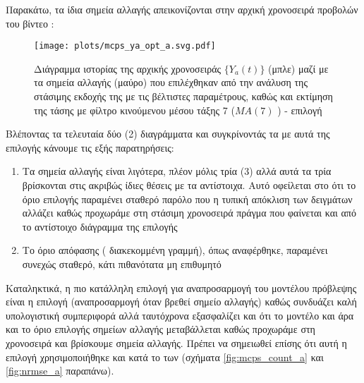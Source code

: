 Παρακάτω, τα ίδια σημεία αλλαγής απεικονίζονται στην αρχική χρονοσειρά προβολών του βίντεο :

\begin{figure}[H]
    \begin{center}
        \texttt{[image: plots/mcps\_ya\_opt\_a.svg.pdf]}
        \caption{Διάγραμμα ιστορίας της αρχικής χρονοσειράς $\{Y_a(t)\}$ (μπλε) μαζί με τα σημεία αλλαγής (μαύρο) που επιλέχθηκαν από την ανάλυση της στάσιμης εκδοχής της με τις βέλτιστες παραμέτρους, καθώς και εκτίμηση της τάσης με φίλτρο κινούμενου μέσου τάξης 7 ($MA(7)$ ) - επιλογή }
        \label{fig:mcps_ya_opt_a}
    \end{center}
\end{figure}

Βλέποντας τα τελευταία δύο (2) διαγράμματα και συγκρίνοντάς τα με αυτά της επιλογής  κάνουμε τις εξής παρατηρήσεις:
\begin{enumerate}
    \item Τα σημεία αλλαγής είναι λιγότερα, πλέον μόλις τρία (3) αλλά αυτά τα τρία βρίσκονται στις ακριβώς ίδιες θέσεις με τα αντίστοιχα. Αυτό οφείλεται στο ότι το όριο επιλογής παραμένει σταθερό παρόλο που η τυπική απόκλιση των δειγμάτων αλλάζει καθώς προχωράμε στη στάσιμη χρονοσειρά πράγμα που φαίνεται και από το αντίστοιχο διάγραμμα της επιλογής 
    \item Το όριο απόφασης ( διακεκομμένη γραμμή), όπως αναφέρθηκε, παραμένει συνεχώς σταθερό, κάτι πιθανότατα μη επιθυμητό
\end{enumerate}

Καταληκτικά, η πιο κατάλληλη επιλογή για αναπροσαρμογή του μοντέλου πρόβλεψης είναι η επιλογή  (αναπροσαρμογή όταν βρεθεί σημείο αλλαγής) καθώς συνδυάζει καλή υπολογιστική συμπεριφορά αλλά ταυτόχρονα εξασφαλίζει και ότι το μοντέλο και άρα και το όριο επιλογής σημείων αλλαγής μεταβάλλεται καθώς προχωράμε στη χρονοσειρά και βρίσκουμε σημεία αλλαγής. Πρέπει να σημειωθεί επίσης ότι αυτή η επιλογή χρησιμοποιήθηκε και κατά το  των  (σχήματα \ref{fig:mcps_count_a} και \ref{fig:nrmse_a} παραπάνω).